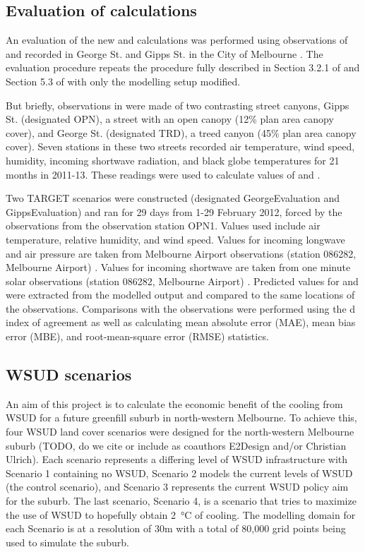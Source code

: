 \documentclass[final,3p,times,authoryear]{elsarticle}
\begin{document}
\subsection{Evaluation of  calculations}\label{sec:methods_eval}

An evaluation of the new  and  calculations was performed using observations of  and  recorded in George St. and Gipps St. in the City of Melbourne \citep{Coutts2015}. The evaluation procedure repeats the procedure fully described in Section 3.2.1 of \cite{Nice2018} and Section 5.3 of \cite{Nice2016} with only the modelling setup modified. 

But briefly, observations in \cite{Coutts2015} were made of two contrasting street canyons, Gipps St. (designated OPN), a street with an open canopy (12\% plan area canopy cover), and George St. (designated TRD), a treed canyon (45\% plan area canopy cover). Seven stations in these two streets recorded air temperature, wind speed, humidity, incoming shortwave radiation, and black globe temperatures for 21 months in 2011-13. These readings were used to calculate values of  and . 


Two TARGET scenarios were constructed (designated GeorgeEvaluation and GippsEvaluation) and ran for 29 days from 1-29 February 2012, forced by the observations from the observation station OPN1. Values used include air temperature, relative humidity, and wind speed. Values for incoming longwave and air pressure are taken from Melbourne Airport observations (station 086282, Melbourne Airport) \citep{BOM2016b}. Values for incoming shortwave are taken from one minute solar observations (station 086282, Melbourne Airport) \citep{BOM2016}. Predicted values for  and  were extracted from the modelled output and compared to the same locations of the observations. Comparisons with the observations were performed using the \cite{Willmott1981} d index of agreement as well as calculating mean absolute error (MAE), mean bias error (MBE), and root-mean-square error (RMSE) statistics.




\subsection{WSUD scenarios}\label{sec:methods_wsudscenarios}
An aim of this project is to calculate the economic benefit of the cooling from WSUD for a future greenfill suburb in north-western Melbourne. To achieve this, four WSUD land cover scenarios were designed for the north-western Melbourne suburb (TODO, do we cite or include as coauthors E2Design and/or Christian Ulrich). Each scenario represents a differing level of WSUD infrastructure with Scenario 1 containing no WSUD, Scenario 2 models the current levels of WSUD (the control scenario), and Scenario 3 represents the current WSUD policy aim for the suburb. The last scenario, Scenario 4, is a scenario that tries to maximize the use of WSUD to hopefully obtain 2\SI{}{\degreeCelsius} of cooling. The modelling domain for each Scenario is at a resolution of 30m with a total of 80,000 grid points being used to simulate the suburb.
\end{document}
